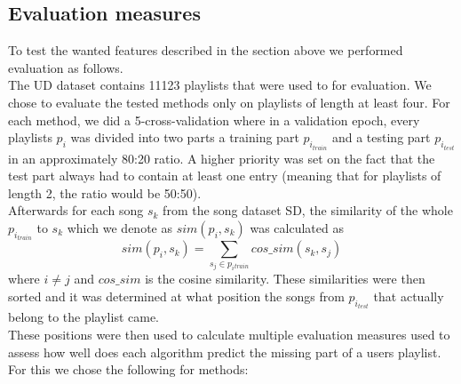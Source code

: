 \subsection{Evaluation measures}\label{ssec:evaluation_measures}
To test the wanted features described in the section above we performed evaluation as follows. \\
The UD dataset contains 11123 playlists that were used to for evaluation. We chose to evaluate the tested methods only on playlists of length at least four. For each method, we did a 5-cross-validation where in a validation epoch, every playlists $p_i$ was divided into two parts a training part $p_{i_{train}}$ and a testing part $p_{i_{test}}$ in an approximately 80:20 ratio. A higher priority was set on the fact that the test part always had to contain at least one entry (meaning that for playlists of length 2, the ratio would be 50:50). \\
Afterwards for each song $ s_k $ from the song dataset SD, the similarity of the whole $p_{i_{train}}$ to $s_k$ which we denote as $ sim(p_i, s_k) $ was calculated as $$ sim(p_i, s_k) =\sum_{s_j\in{p_i{_{train}}}} cos\_sim(s_k, s_j) $$ where $ i \neq j$ and $cos\_sim$ is the cosine similarity. These similarities were then sorted and it was determined at what position the songs from $p_{i_{test}} $ that actually belong to the playlist came. \\
These positions were then used to calculate multiple evaluation measures used to assess how well does each algorithm predict the missing part of a users playlist. For this we chose the following for methods:
